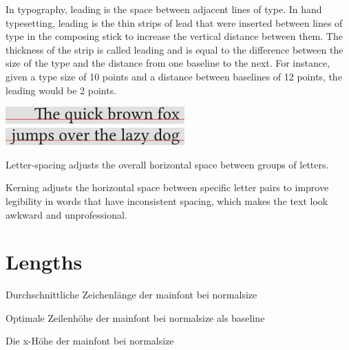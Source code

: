 \documentclass[a4paper,10pt]{scrarticle}
\begin{document}
\noindent{} In typography, leading is the space between adjacent lines of type. 
In hand typesetting, leading is the thin strips of lead that were inserted between lines of type in the composing stick to increase the vertical distance between them. 
The thickness of the strip is called leading and is equal to the difference between the size of the type and the distance from one baseline to the next. For instance, given a type size of 10 points and a distance between baselines of 12 points, the leading would be 2 points.\par
\medskip
{\centering \includegraphics[scale=1]{img/Typography leading font.png} \par}
\medskip

\noindent{}

\noindent{}

\noindent{}

\noindent{} Letter-spacing adjusts the overall horizontal space between groups of letters.
 
\noindent{} Kerning adjusts the horizontal space between specific letter pairs to improve legibility in words that have inconsistent spacing, which makes the text look awkward and unprofessional.

\section{Lengths}

\noindent{} Durchschnittliche Zeichenlänge der mainfont bei normalsize

\noindent{} Optimale Zeilenhöhe der mainfont bei normalsize als baseline

\noindent{} Die x-Höhe der mainfont bei normalsize 
\end{document}
